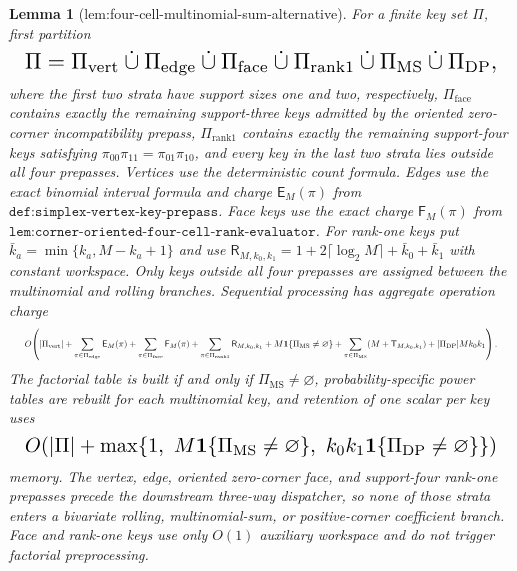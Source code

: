 \documentclass{article}
\newtheorem{lemma}{Lemma}
\begin{document}
\begin{lemma}[lem:four-cell-multinomial-sum-alternative]
For a finite key set \(\Pi\), first partition
\[
\makebox[\linewidth][c]{\resizebox{0.98\linewidth}{!}{\(\displaystyle \Pi=\Pi_{\mathrm{vert}}\mathbin{\dot\cup}\Pi_{\mathrm{edge}}
\mathbin{\dot\cup}\Pi_{\mathrm{face}}\mathbin{\dot\cup}
\Pi_{\mathrm{rank1}}\mathbin{\dot\cup}
\Pi_{\mathrm{MS}}\mathbin{\dot\cup}\Pi_{\mathrm{DP}},\)}}
\]
where the first two strata have support sizes one and two, respectively, \(\Pi_{\mathrm{face}}\) contains exactly the remaining support-three keys admitted by the oriented zero-corner incompatibility prepass, \(\Pi_{\mathrm{rank1}}\) contains exactly the remaining support-four keys satisfying \(\pi_{00}\pi_{11}=\pi_{01}\pi_{10}\), and every key in the last two strata lies outside all four prepasses. Vertices use the deterministic count formula. Edges use the exact binomial interval formula and charge \(\mathsf E_M(\pi)\) from \(\texttt{def:simplex-vertex-key-prepass}\). Face keys use the exact charge \(\mathsf F_M(\pi)\) from \(\texttt{lem:corner-oriented-four-cell-rank-evaluator}\). For rank-one keys put \(\bar k_a=\min\{k_a,M-k_a+1\}\) and use \(\mathsf R_{M,k_0,k_1}=1+2\lceil\log_2M\rceil+\bar k_0+\bar k_1\) with constant workspace. Only keys outside all four prepasses are assigned between the multinomial and rolling branches. Sequential processing has aggregate operation charge
\[
\makebox[\linewidth][c]{\resizebox{0.98\linewidth}{!}{\(\displaystyle O\!\left(
|\Pi_{\mathrm{vert}}|
+\sum_{\pi\in\Pi_{\mathrm{edge}}}\mathsf E_M(\pi)
+\sum_{\pi\in\Pi_{\mathrm{face}}}\mathsf F_M(\pi)
+\sum_{\pi\in\Pi_{\mathrm{rank1}}}\mathsf R_{M,k_0,k_1}
+M\mathbf 1\{\Pi_{\mathrm{MS}}\ne\varnothing\}
+\sum_{\pi\in\Pi_{\mathrm{MS}}}(M+\mathsf T_{M,k_0,k_1})
+|\Pi_{\mathrm{DP}}|Mk_0k_1
\right).\)}}
\]
The factorial table is built if and only if \(\Pi_{\mathrm{MS}}\ne\varnothing\), probability-specific power tables are rebuilt for each multinomial key, and retention of one scalar per key uses
\[
\makebox[\linewidth][c]{\resizebox{0.98\linewidth}{!}{\(\displaystyle O\!\left(
|\Pi|+\max\{1,\ M\mathbf 1\{\Pi_{\mathrm{MS}}\ne\varnothing\},\
k_0k_1\mathbf 1\{\Pi_{\mathrm{DP}}\ne\varnothing\}\}
\right)\)}}
\]
memory. The vertex, edge, oriented zero-corner face, and support-four rank-one prepasses precede the downstream three-way dispatcher, so none of those strata enters a bivariate rolling, multinomial-sum, or positive-corner coefficient branch. Face and rank-one keys use only \(O(1)\) auxiliary workspace and do not trigger factorial preprocessing.
\end{lemma}
\end{document}
